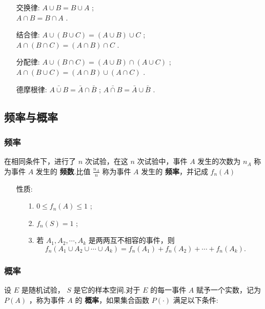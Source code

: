 \documentclass[UTF8,10pt]{ctexart}
\begin{document}
	\begin{itemize}
		\item [交换律:] $ A \cup B=B \cup A $ ; \\ $  A \cap B=B \cap A  $ .
		\item [结合律:] $ A \cup (B \cup C)=(A \cup B) \cup C $ ; \\ $  A \cap (B \cap C)=(A \cap B) \cap C $ .
		\item [分配律:] $ A \cup (B \cap C)=(A \cup B) \cap (A \cup C) $ ; \\ $ A \cap (B \cup C)=(A \cap B) \cup (A \cap C) $ .
		\item [德摩根律:] $ \bar{A \cup B} = \bar{A} \cap \bar{B} $ ; $ \bar{A \cap B} = \bar{A} \cup \bar{B} $ .
	\end{itemize}
	
	\subsection{频率与概率}
	
	\subsubsection{频率}
	
	在相同条件下，进行了 $ n $ 次试验，在这 $ n $ 次试验中，事件 $ A $ 发生的次数为 $ n_{A} $ 称为事件 $ A $ 发生的 \textbf{频数}.比值 $ \frac{n_{A}}{n} $ 称为事件 $ A $ 发生的 \textbf{频率}，并记成 $ f_{n}(A) $ 
	
	\begin{itemize}
		\item [性质:] {
			\begin{enumerate}
				\item [1.] $ 0 \le f_{n}(A) \le 1 $ ;
				\item [2.] $ f_{n}(S)=1 $ ;
				\item [3.] 若 $A_{1},A_{2}, \cdots ,A_{k} $ 是两两互不相容的事件，则 $$ f_{n}(A_{1} \cup A_{2} \cup \cdots \cup A_{k})=f_{n}(A_{1})+f_{n}(A_{2})+ \cdots +f_{n}(A_{k}). $$ 
			\end{enumerate}
		}
	\end{itemize}

	\subsubsection{概率}
	
	设 $ E $ 是随机试验， $ S $ 是它的样本空间.对于 $ E $ 的每一事件 $ A $ 赋予一个实数，记为 $ P(A) $ ，称为事件 $ A $ 的 \textbf{概率}，如果集合函数 $ P( \cdot ) $ 满足以下条件:
	
\end{document}
